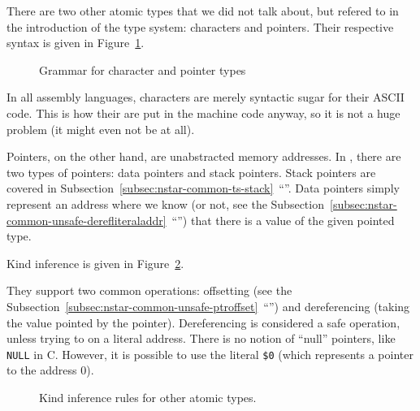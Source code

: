There are two other atomic types that we did not talk about, but refered to in the introduction of the type system: characters and pointers. Their respective syntax is given in Figure~\ref{fig:nstar-common-ts-atomic-syntax}.

\begin{figure}[htb]
	\centering
	\caption{Grammar for character and pointer types}
	\label{fig:nstar-common-ts-atomic-syntax}
\end{figure}

In all assembly languages, characters are merely syntactic sugar for their ASCII code. This is how their are put in the machine code anyway, so it is not a huge problem (it might even not be at all).

Pointers, on the other hand, are unabstracted memory addresses.
In \nstar, there are two types of pointers: data pointers and stack pointers.
Stack pointers are covered in Subsection~\ref{subsec:nstar-common-ts-stack}~``''.
Data pointers simply represent an address where we know (or not, see the Subsection~\ref{subsec:nstar-common-unsafe-derefliteraladdr}~``'') that there is a value of the given pointed type.

Kind inference is given in Figure~\ref{fig:nstar-common-ts-atomic-kindrules}.

They support two common operations: offsetting (see the Subsection~\ref{subsec:nstar-common-unsafe-ptroffset}~``'') and dereferencing (taking the value pointed by the pointer).
Dereferencing is considered a safe operation, unless trying to on a literal address.
There is no notion of ``null'' pointers, like \texttt{NULL} in C.
However, it is possible to use the literal \texttt{\$0} (which represents a pointer to the address $0$).

\begin{figure}[htb]
	\centering

	\caption{Kind inference rules for other atomic types.}
	\label{fig:nstar-common-ts-atomic-kindrules}
\end{figure}

